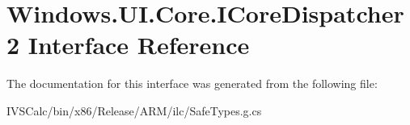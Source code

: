 \hypertarget{interface_windows_1_1_u_i_1_1_core_1_1_i_core_dispatcher2}{}\section{Windows.\+U\+I.\+Core.\+I\+Core\+Dispatcher2 Interface Reference}
\label{interface_windows_1_1_u_i_1_1_core_1_1_i_core_dispatcher2}


The documentation for this interface was generated from the following file\+:\begin{DoxyCompactItemize}
\item 
I\+V\+S\+Calc/bin/x86/\+Release/\+A\+R\+M/ilc/Safe\+Types.\+g.\+cs\end{DoxyCompactItemize}
